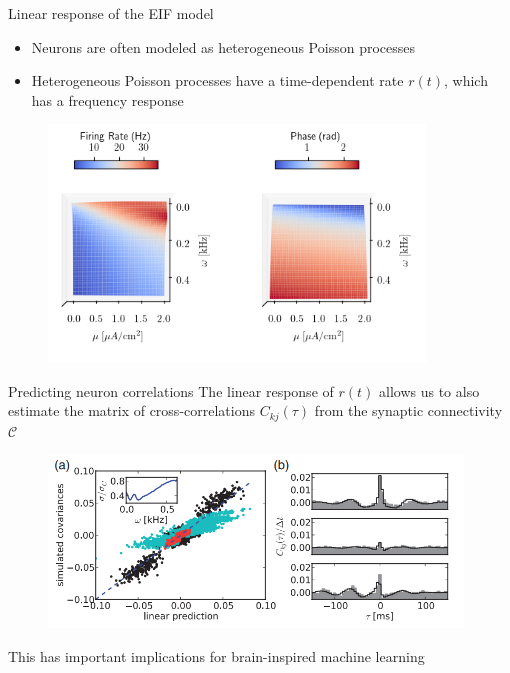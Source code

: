 \documentclass[aspectratio=169]{beamer}
\begin{document}
\begin{frame}{Linear response of the EIF model}

\begin{itemize}
\item Neurons are often modeled as heterogeneous Poisson processes
\item Heterogeneous Poisson processes have a time-dependent rate $r(t)$, which has a frequency response
\end{itemize}

\begin{figure}
\centering
\includegraphics[width=100mm]{figure-4}
\end{figure}

\end{frame}

\begin{frame}{Predicting neuron correlations}
The linear response of $r(t)$ allows us to also estimate the matrix of cross-correlations $C_{kj}(\tau)$
from the synaptic connectivity $\mathcal{C}$
\begin{figure}
\centering
\includegraphics[width=110mm]{figure-20}
\end{figure}

This has important implications for brain-inspired machine learning

\end{frame}
\end{document}
